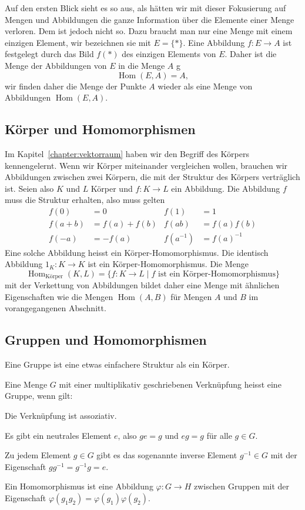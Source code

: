 Auf den ersten Blick sieht es so aus, als hätten wir mit dieser Fokusierung
auf Mengen und Abbildungen die ganze Information über die Elemente einer Menge
verloren.
Dem ist jedoch nicht so.
Dazu braucht man nur eine Menge mit einem einzigen Element, wir bezeichnen
sie mit $E=\{*\}$.
Eine Abbildung $f\colon E\to A$ ist festgelegt durch das Bild $f(*)$
des einzigen Elements von $E$.
Daher ist die Menge der Abbildungen von $E$ in die Menge $A$ g
\[
\operatorname{Hom}(E,A)
=
A,
\]
wir finden daher die Menge der Punkte $A$ wieder als eine Menge von
Abbildungen $\operatorname{Hom}(E,A)$.

\subsection{Körper und Homomorphismen}
Im Kapitel~\ref{chapter:vektorraum} haben wir den Begriff des Körpers
kennengelernt.
Wenn wir Körper miteinander vergleichen wollen, brauchen wir Abbildungen
zwischen zwei Körpern, die mit der Struktur des Körpers verträglich ist.
Seien also $K$ und $L$ Körper und $f\colon K\to L$ ein Abbildung.
Die Abbildung $f$ muss die Struktur erhalten, also muss gelten
\[
\begin{aligned}
f(0)&=0&f(1)&=1\\
f(a+b)&=f(a)+f(b)&f(ab)&=f(a)f(b)\\
f(-a)&=-f(a)&f(a^{-1})&=f(a)^{-1}
\end{aligned}
\]
Eine solche Abbildung heisst ein Körper-Homomorphismus.
Die identisch Abbildung $1_K\colon K\to K$ ist ein Körper-Homomorphismus.
Die Menge
\[
\operatorname{Hom}_{\text{Körper}}(K,L)
=
\{f\colon K\to L\;|\;\text{$f$ ist ein Körper-Homomorphismus}\}
\]
mit der Verkettung von Abbildungen
bildet daher eine Menge mit ähnlichen Eigenschaften wie die
Mengen $\operatorname{Hom}(A,B)$ für Mengen $A$ und $B$ im
vorangegangenen Abschnitt.

\subsection{Gruppen und Homomorphismen}
Eine Gruppe ist eine etwas einfachere Struktur als ein Körper.

\begin{definition}
Eine Menge $G$ mit einer multiplikativ geschriebenen Verknüpfung heisst
eine Gruppe, wenn gilt:
\begin{compactenum}
\item Die Verknüpfung ist assoziativ.
\item Es gibt ein neutrales Element $e$, also $ge=g$ und $eg=g$ für alle 
$g\in G$.
\item Zu jedem Element $g\in G$ gibt es das sogenannte inverse
Element $g^{-1}\in G$ mit der Eigenschaft $gg^{-1}=g^{-1}g=e$.
\end{compactenum}
Ein Homomorphismus ist eine Abbildung $\varphi\colon G\to H$ zwischen
Gruppen mit der Eigenschaft
$\varphi(g_1g_2)=\varphi(g_1)\varphi(g_2).$
\end{definition}

